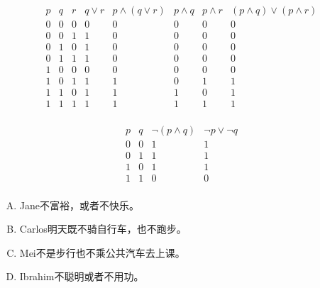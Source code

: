 {    %
    \begin{practices}
        \begin{table}[H]
            \[
                \begin{array}{c|c|c|c|c|c|c|c}
                    \hline
                    p & q & r & q \vee r & p \wedge (q \vee r) & p \wedge q & p \wedge r & (p \wedge q) \vee (p \wedge r) \\
                    \hline
                    0 & 0 & 0 & 0 & 0 & 0 & 0 & 0 \\
                    0 & 0 & 1 & 1 & 0 & 0 & 0 & 0 \\
                    0 & 1 & 0 & 1 & 0 & 0 & 0 & 0 \\
                    0 & 1 & 1 & 1 & 0 & 0 & 0 & 0 \\
                    1 & 0 & 0 & 0 & 0 & 0 & 0 & 0 \\
                    1 & 0 & 1 & 1 & 1 & 0 & 1 & 1 \\
                    1 & 1 & 0 & 1 & 1 & 1 & 0 & 1 \\
                    1 & 1 & 1 & 1 & 1 & 1 & 1 & 1 \\
                \end{array}
            \]
        \end{table}
    \end{practices}

    \begin{practices}
        \begin{table}[H]
            \[
                \begin{array}{c|c|c|c}
                    \hline
                    p & q & \neg (p \wedge q) &\neg p \vee \neg q \\
                    \hline
                    0 & 0 & 1 & 1 \\
                    0 & 1 & 1 & 1 \\
                    1 & 0 & 1 & 1 \\
                    1 & 1 & 0 & 0 \\
                \end{array}
            \]
        \end{table}
    \end{practices}

    \begin{practices}
        \begin{enumerate}[A.]
            \item Jane不富裕，或者不快乐。
            \item Carlos明天既不骑自行车，也不跑步。
            \item Mei不是步行也不乘公共汽车去上课。
            \item Ibrahim不聪明或者不用功。
        \end{enumerate}
    \end{practices}

}
